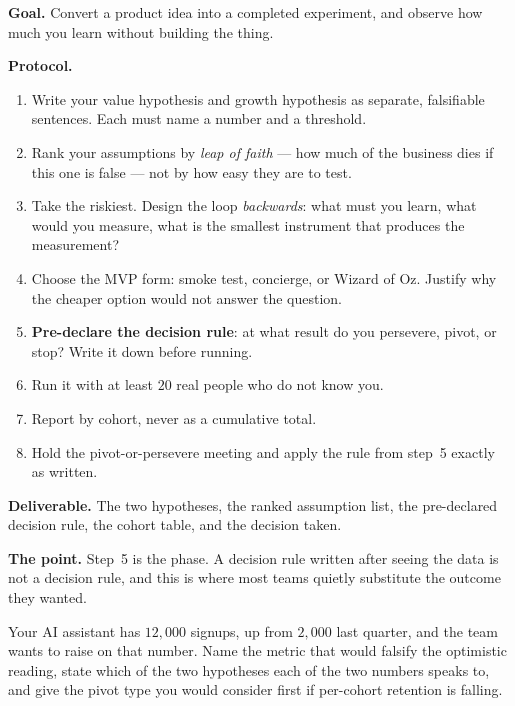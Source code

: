 \begin{practicallab}
\textbf{Goal.} Convert a product idea into a completed experiment, and observe
how much you learn without building the thing.

\textbf{Protocol.}
\begin{enumerate}
  \item Write your value hypothesis and growth hypothesis as separate,
        falsifiable sentences. Each must name a number and a threshold.
  \item Rank your assumptions by \emph{leap of faith} --- how much of the
        business dies if this one is false --- not by how easy they are to test.
  \item Take the riskiest. Design the loop \emph{backwards}: what must you
        learn, what would you measure, what is the smallest instrument that
        produces the measurement?
  \item Choose the MVP form: smoke test, concierge, or Wizard of Oz. Justify
        why the cheaper option would not answer the question.
  \item \textbf{Pre-declare the decision rule}: at what result do you persevere,
        pivot, or stop? Write it down before running.
  \item Run it with at least $20$ real people who do not know you.
  \item Report by cohort, never as a cumulative total.
  \item Hold the pivot-or-persevere meeting and apply the rule from step~5
        exactly as written.
\end{enumerate}

\textbf{Deliverable.} The two hypotheses, the ranked assumption list, the
pre-declared decision rule, the cohort table, and the decision taken.

\textbf{The point.} Step~5 is the phase. A decision rule written after seeing
the data is not a decision rule, and this is where most teams quietly
substitute the outcome they wanted.
\end{practicallab}

\begin{checkpoint}
Your AI assistant has $12{,}000$ signups, up from $2{,}000$ last quarter, and
the team wants to raise on that number. Name the metric that would falsify the
optimistic reading, state which of the two hypotheses each of the two numbers
speaks to, and give the pivot type you would consider first if per-cohort
retention is falling.
\end{checkpoint}


